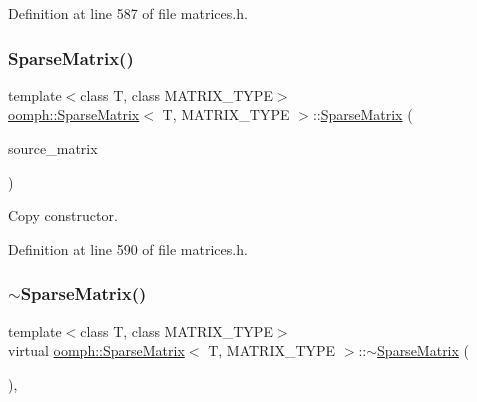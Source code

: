 Definition at line 587 of file matrices.\+h.

\mbox{\label{classoomph_1_1SparseMatrix_a9e4062d0e4f877537d195aada71d854d}} 
\subsubsection{\texorpdfstring{Sparse\+Matrix()}{SparseMatrix()}\hspace{0.1cm}{\footnotesize\ttfamily [2/2]}}
{\footnotesize\ttfamily template$<$class T, class M\+A\+T\+R\+I\+X\+\_\+\+T\+Y\+PE$>$ \\
\hyperlink{classoomph_1_1SparseMatrix}{oomph\+::\+Sparse\+Matrix}$<$ T, M\+A\+T\+R\+I\+X\+\_\+\+T\+Y\+PE $>$\+::\hyperlink{classoomph_1_1SparseMatrix}{Sparse\+Matrix} (\begin{DoxyParamCaption}\item[{const \hyperlink{classoomph_1_1SparseMatrix}{Sparse\+Matrix}$<$ T, M\+A\+T\+R\+I\+X\+\_\+\+T\+Y\+PE $>$ \&}]{source\+\_\+matrix }\end{DoxyParamCaption})\hspace{0.3cm}{\ttfamily [inline]}}



Copy constructor. 



Definition at line 590 of file matrices.\+h.

\mbox{\label{classoomph_1_1SparseMatrix_aa938bb1200e49f080b980fe7248f589e}} 
\subsubsection{\texorpdfstring{$\sim$\+Sparse\+Matrix()}{~SparseMatrix()}}
{\footnotesize\ttfamily template$<$class T, class M\+A\+T\+R\+I\+X\+\_\+\+T\+Y\+PE$>$ \\
virtual \hyperlink{classoomph_1_1SparseMatrix}{oomph\+::\+Sparse\+Matrix}$<$ T, M\+A\+T\+R\+I\+X\+\_\+\+T\+Y\+PE $>$\+::$\sim$\hyperlink{classoomph_1_1SparseMatrix}{Sparse\+Matrix} (\begin{DoxyParamCaption}{ }\end{DoxyParamCaption})\hspace{0.3cm}{\ttfamily [inline]}, {\ttfamily [virtual]}}



